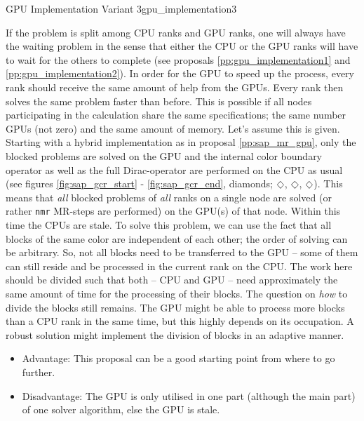 \documentclass{article}
\DeclareRobustCommand{\diamond}{%
  \mathbin{\text{\scalebox{.75}{\rotatebox[origin=c]{45}{$\Box$}}}}%
}
\theoremstyle{plain} %
\theoremstyle{convention} %
\theoremstyle{remark} %
\def\code#1{\texttt{#1}}
\numberwithin{equation}{section}
\begin{document}
\begin{proposal}{GPU Implementation Variant 3}{gpu_implementation3} %

If the problem is split among CPU ranks and GPU ranks, one will always have the waiting problem in the sense that either the CPU or the GPU ranks will have to wait for the others to complete (see proposals \ref{pp:gpu_implementation1} and \ref{pp:gpu_implementation2}). In order for the GPU to speed up the process, every rank should receive the same amount of help from the GPUs. Every rank then solves the same problem faster than before. This is possible if all nodes participating in the calculation share the same specifications; the same number GPUs (not zero) and the same amount of memory. Let's assume this is given. Starting with a hybrid implementation as in proposal \ref{pp:sap_mr_gpu}, only the blocked problems are solved on the GPU and the internal color boundary operator as well as the full Dirac-operator are performed on the CPU as usual (see figures \ref{fig:sap_gcr_start} - \ref{fig:sap_gcr_end}, diamonds; \textcolor{cbrown}{$\diamond$}, \textcolor{cred}{$\diamond$}, \textcolor{cblue}{$\diamond$}). This means that \textit{all} blocked problems of \textit{all} ranks on a single node are solved (or rather \code{nmr} MR-steps are performed) on the GPU(s) of that node. Within this time the CPUs are stale. To solve this problem, we can use the fact that all blocks of the same color are independent of each other; the order of solving can be arbitrary. So, not all blocks need to be transferred to the GPU -- some of them can still reside and be processed in the current rank on the CPU. The work here should be divided such that both -- CPU and GPU -- need approximately the same amount of time for the processing of their blocks. The question on \textit{how} to divide the blocks still remains. The GPU might be able to process more blocks than a CPU rank in the same time, but this highly depends on its occupation. A robust solution might implement the division of blocks in an adaptive manner.

\begin{itemize}
    \item Advantage: This proposal can be a good starting point from where to go further.
    \item Disadvantage: The GPU is only utilised in one part (although the main part) of one solver algorithm, else the GPU is stale.
\end{itemize}

\end{proposal}
\end{document}
